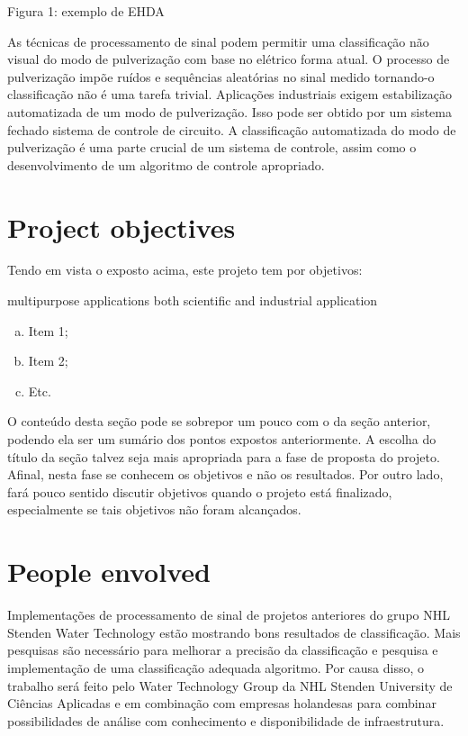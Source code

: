 Figura 1: exemplo de EHDA

As técnicas de processamento de sinal podem permitir uma classificação não visual do modo de pulverização com base no elétrico
forma atual. O processo de pulverização impõe ruídos e sequências aleatórias no sinal medido tornando-o
classificação não é uma tarefa trivial.
Aplicações industriais exigem estabilização automatizada de um modo de pulverização. Isso pode ser obtido por um sistema fechado
sistema de controle de circuito. A classificação automatizada do modo de pulverização é uma parte crucial de um sistema de controle, assim como
o desenvolvimento de um algoritmo de controle apropriado.

\section{Project objectives}
\label{sec:objetivos}

Tendo em vista o exposto acima, este projeto tem por objetivos:

multipurpose applications
both scientific and industrial application

\begin{enumerate}[a)]
\item Item 1;
\item Item 2; 
\item Etc.     
\end{enumerate}

O conteúdo desta seção pode se sobrepor um pouco com o da seção anterior, podendo ela ser um sumário dos pontos expostos anteriormente. A escolha do título da seção talvez seja mais apropriada para a fase de proposta do projeto. Afinal, nesta fase se conhecem os objetivos e não os resultados. Por outro lado, fará pouco sentido discutir objetivos quando o projeto está finalizado, especialmente se tais objetivos não foram alcançados. 


\section{People envolved}
\label{sec:empresa}

Implementações de processamento de sinal de projetos anteriores
do grupo NHL Stenden Water Technology estão mostrando bons resultados de classificação. Mais pesquisas são
necessário para melhorar a precisão da classificação e pesquisa e implementação de uma classificação adequada
algoritmo. Por causa disso, o trabalho será feito pelo Water Technology Group da NHL Stenden University
de Ciências Aplicadas e em combinação com empresas holandesas para combinar possibilidades de análise com conhecimento
e disponibilidade de infraestrutura.


\clearpage